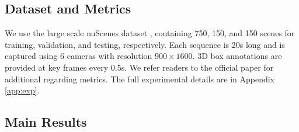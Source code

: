 \documentclass[runningheads, hyperfootnotes=false]{article}
\begin{document}
\subsection{Dataset and Metrics}
We use the large scale nuScenes dataset \cite{nuscenes2019}, containing 750, 150, and 150 scenes for training, validation, and testing, respectively. Each sequence is 20s long and is captured using 6 cameras with resolution $900 \times 1600$. 3D box annotations are provided at key frames every 0.5s. We refer readers to the official paper \cite{nuscenes2019} for additional regarding metrics. The full experimental details are in Appendix \ref{app:exp}.

\subsection{Main Results}
\end{document}
